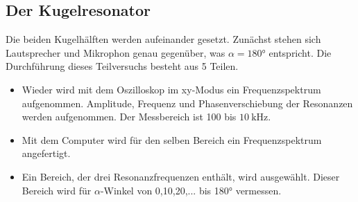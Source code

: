 \subsection{Der Kugelresonator}
Die beiden Kugelhälften werden aufeinander gesetzt. Zunächst stehen sich Lautsprecher und Mikrophon genau gegenüber, was $\alpha=180°$ entspricht. Die Durchführung dieses Teilversuchs besteht aus 5 Teilen.
\begin{itemize}
  \item Wieder wird mit dem Oszilloskop im xy-Modus ein Frequenzspektrum aufgenommen. Amplitude, Frequenz und Phasenverschiebung der Resonanzen werden aufgenommen. Der Messbereich ist 100 bis $\SI{10}{\kilo\hertz}$.
  \item Mit dem Computer wird für den selben Bereich ein Frequenzspektrum angefertigt.
  \item Ein Bereich, der drei Resonanzfrequenzen enthält, wird ausgewählt. Dieser Bereich wird für $\alpha$-Winkel von 0,10,20,... bis 180° vermessen.
\end{itemize}
